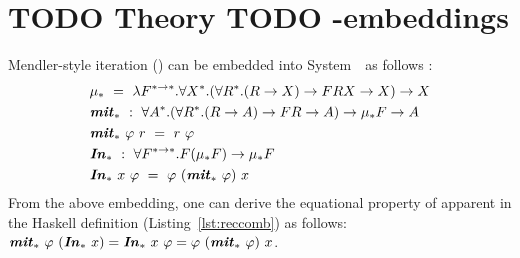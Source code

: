\section{TODO Theory TODO \Fw-embeddings}\label{sec:theory}

Mendler-style iteration (\MIt{*}) can be embedded into System~\Fw\ as follows
\cite{TODO,TODO,TODO}:
\begin{align*}
&\mu_{*} ~=~ \lambda F^{* \to *}.\forall X^{*}.
		(\forall R^{*}.(R \to X) \to F R X \to X) \to X
	\\
&\textbf{\textit{mit}}_{*} ~:~ \forall A^{*}.
	(\forall R^{*}.(R \to A) \to F R \to A) \to \mu_{*} F \to A \\
&\textbf{\textit{mit}}_{*}~\varphi~r ~=~ r~\varphi
	\\
&\textbf{\textit{In}}_{*} ~:~\forall F^{* \to *}.F(\mu_{*} F) \to \mu_{*} F \\
&\textbf{\textit{In}}_{*}~x~\varphi ~=~ \varphi~(\textbf{\textit{mit}}_{*}~\varphi)~x
\end{align*}
From the above embedding, one can derive the equational property of \MsfIt{*}
apparent in the Haskell definition (Listing~\ref{lst:reccomb}) as follows:
$\textbf{\textit{mit}}_{*}~\varphi~(\textbf{\textit{In}}_{*}~x) = \textbf{\textit{In}}_{*}~x~\varphi = \varphi~(\textbf{\textit{mit}}_{*}~\varphi)~x$.

